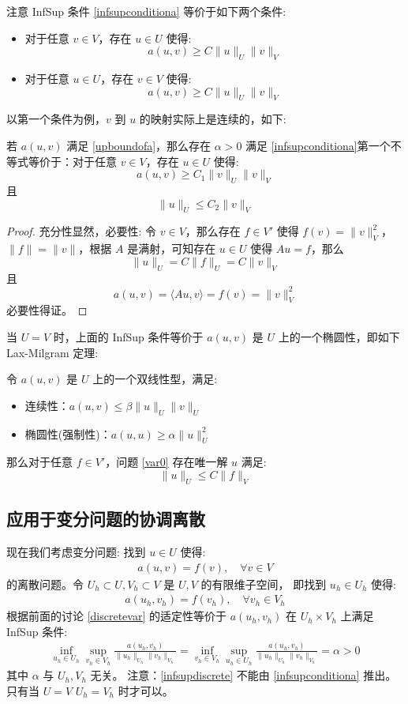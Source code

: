 \documentclass[lang=cn,a4paper,newtx]{elegantpaper}
\begin{document}
注意 InfSup 条件 \eqref{infsupconditiona} 等价于如下两个条件:
\begin{itemize}
    \item 对于任意 $v\in V$，存在 $u\in U$ 使得:
        $$
        a(u, v)\geq C \|u\|_U\|v\|_V
        $$
    \item 对于任意 $u\in U$，存在 $v\in V$ 使得:
        $$
        a(u, v)\geq C \|u\|_U\|v\|_V
        $$
\end{itemize}
以第一个条件为例，$v$ 到 $u$ 的映射实际上是连续的，如下:
\begin{corollary}
    若 $a(u, v)$ 满足 \eqref{upboundofa}，那么存在 $\alpha > 0$ 满足
    \eqref{infsupconditiona}第一个不等式等价于：对于任意 $v\in V$，存在 $u\in U$ 使得:
    $$
    a(u, v)\geq C_1 \|v\|_U\|v\|_V
    $$
    且
    $$
    \|u\|_U \leq C_2\|v\|_V
    $$
\end{corollary}
\begin{proof}
    充分性显然，必要性: 令 $v\in V$，那么存在 $f \in V'$ 使得 $f(v) = \|v\|_V^2$，
    $\|f\| = \|v\|$，根据 $A$ 是满射，可知存在 $u \in U$ 使得 $Au = f$，那么
    $$
    \|u\|_U = C\|f\|_U = C\|v\|_V
    $$
    且
    $$
    a(u, v) = \langle Au,  v\rangle = f(v) = \|v\|_V^2
    $$
    必要性得证。
\end{proof}

当 $U = V$ 时，上面的 InfSup 条件等价于 $a(u, v)$ 是 $U$ 上的一个椭圆性，即如下
Lax-Milgram 定理:
\begin{theorem}
    令 $a(u, v)$ 是 $U$ 上的一个双线性型，满足:
    \begin{itemize}
        \item 连续性：$a(u, v) \leq \beta\|u\|_U\|v\|_U$
        \item 椭圆性(强制性)：$a(u, u) \geq \alpha\|u\|_U^2$
    \end{itemize}
    那么对于任意 $f\in V'$，问题 \eqref{var0} 存在唯一解 $u$ 满足:
    $$
    \|u\|_U \leq C\|f\|_V
    $$
\end{theorem}

\subsection{应用于变分问题的协调离散}
现在我们考虑变分问题: 找到 $u\in U$ 使得:
\begin{align}
a(u, v) = f(v), \quad \forall v \in V
\end{align}
的离散问题。令 $U_h \subset U, V_h \subset V$ 是 $U, V$ 的有限维子空间，
即找到 $u_h \in U_h$ 使得:
\begin{align}
\label{discretevar}
a(u_h, v_h) = f(v_h), \quad \forall v_h \in V_h
\end{align}
根据前面的讨论 \eqref{discretevar} 的适定性等价于 $a(u_h, v_h)$ 在 $U_h\times V_h$
上满足 InfSup 条件:
\begin{align}
\label{infsupdiscrete}
\inf_{u_h\in U_h}\sup_{v_h\in V_h}\frac{a(u_h, v_h)}{\|u_h\|_{U_h}\|v_h\|_{V_h}} 
= 
\inf_{v_h\in V_h}\sup_{u_h\in U_h}\frac{a(u_h, v_h)}{\|u_h\|_{U_h}\|v_h\|_{V_h}}
= \alpha > 0
\end{align}
其中 $\alpha$ 与 $U_h, V_h$ 无关。
注意：\eqref{infsupdiscrete} 不能由 \eqref{infsupconditiona} 推出。只有当 $U=V$
$U_h = V_h$ 时才可以。
\end{document}
